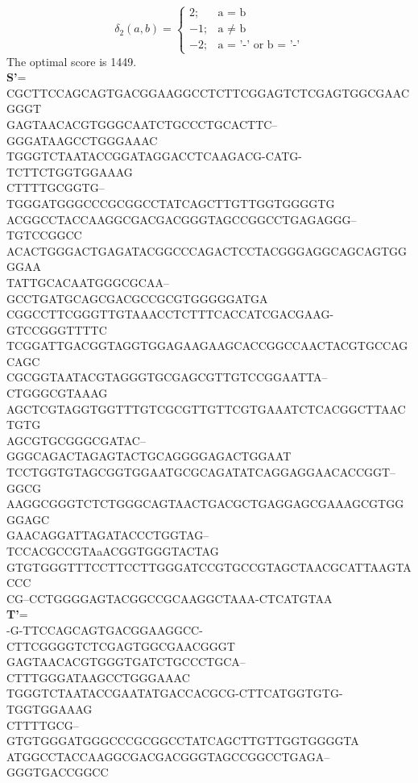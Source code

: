 \documentclass[11pt]{article}
\begin{document}
\begin{CJK}{UTF8}{gkai}
\begin{equation}
\delta_2(a,b)=
\begin{cases}
  	   2; &\text{a = b}\\
           -1; &\text{a $\neq$ b}\\ 
	   -2; &\text{a = '-' or b = '-'}
\end{cases}
\end{equation}
The optimal score is 1449.\\
{\tiny
{\bf S'}=\\
CGCTTCCAGCAGTGACGGAAGGCCTCTTCGGAGTCTCGAGTGGCGAACGGGT\\
GAGTAACACGTGGGCAATCTGCCCTGCACTTC--GGGATAAGCCTGGGAAAC\\
TGGGTCTAATACCGGATAGGACCTCAAGACG-CATG-TCTTCTGGTGGAAAG\\
CTTTTGCGGTG--TGGGATGGGCCCGCGGCCTATCAGCTTGTTGGTGGGGTG\\
ACGGCCTACCAAGGCGACGACGGGTAGCCGGCCTGAGAGGG--TGTCCGGCC\\
ACACTGGGACTGAGATACGGCCCAGACTCCTACGGGAGGCAGCAGTGGGGAA\\
TATTGCACAATGGGCGCAA--GCCTGATGCAGCGACGCCGCGTGGGGGATGA\\
CGGCCTTCGGGTTGTAAACCTCTTTCACCATCGACGAAG-GTCCGGGTTTTC\\
TCGGATTGACGGTAGGTGGAGAAGAAGCACCGGCCAACTACGTGCCAGCAGC\\
CGCGGTAATACGTAGGGTGCGAGCGTTGTCCGGAATTA--CTGGGCGTAAAG\\
AGCTCGTAGGTGGTTTGTCGCGTTGTTCGTGAAATCTCACGGCTTAACTGTG\\
AGCGTGCGGGCGATAC--GGGCAGACTAGAGTACTGCAGGGGAGACTGGAAT\\
TCCTGGTGTAGCGGTGGAATGCGCAGATATCAGGAGGAACACCGGT--GGCG\\
AAGGCGGGTCTCTGGGCAGTAACTGACGCTGAGGAGCGAAAGCGTGGGGAGC\\
GAACAGGATTAGATACCCTGGTAG--TCCACGCCGTAaACGGTGGGTACTAG\\
GTGTGGGTTTCCTTCCTTGGGATCCGTGCCGTAGCTAACGCATTAAGTACCC\\
CG--CCTGGGGAGTACGGCCGCAAGGCTAAA-CTCATGTAA\\
}
{\tiny
{\bf T'}=\\
-G-TTCCAGCAGTGACGGAAGGCC-CTTCGGGGTCTCGAGTGGCGAACGGGT\\
GAGTAACACGTGGGTGATCTGCCCTGCA--CTTTGGGATAAGCCTGGGAAAC\\
TGGGTCTAATACCGAATATGACCACGCG-CTTCATGGTGTG-TGGTGGAAAG\\
CTTTTGCG--GTGTGGGATGGGCCCGCGGCCTATCAGCTTGTTGGTGGGGTA\\
ATGGCCTACCAAGGCGACGACGGGTAGCCGGCCTGAGA--GGGTGACCGGCC\\
}
\end{CJK}
\end{document}
